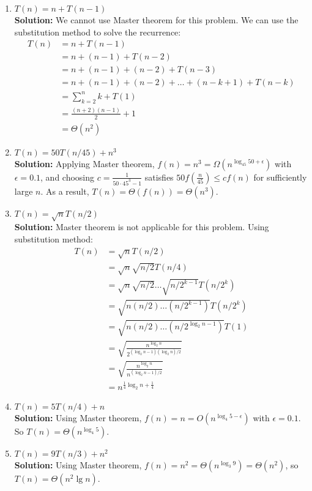 \documentclass[letterpaper, 11pt]{article}
\begin{document}
\begin{enumerate}
\item $T(n) = n+T(n-1)$\\
\textbf{Solution:} We cannot use Master theorem for this problem. We can use the substitution method to solve the recurrence:\\
\begin{align}
    T(n) &= n+T(n-1) \\
    &=n+(n-1)+T(n-2) \\
    &=n+(n-1)+(n-2)+T(n-3) \\
    &=n+(n-1)+(n-2)+\dots+(n-k+1)+T(n-k)\\
    &=\sum_{k=2}^{n}{k}+T(1)\\
    &=\frac{(n+2)(n-1)}{2}+1 \\
    &=\Theta(n^2)
\end{align}

\item $T(n) = 50T(n/45) + n^3$\\
\textbf{Solution:} Applying Master theorem, $f(n)=n^3=\Omega(n^{\log_{45}{50}+\epsilon})$ with $\epsilon=0.1$, and choosing $c=\frac{1}{50\cdot45^3-1}$ satisfies $50f(\frac{n}{45}) \le cf(n)$ for sufficiently large $n$. As a result, $T(n)=\Theta(f(n))=\Theta(n^3)$.

\item $T(n) = \sqrt{n}T(n/2)$\\
\textbf{Solution:} Master theorem is not applicable for this problem. Using substitution method:\\
\begin{align}
    T(n) &= \sqrt{n}T(n/2)\\
         &= \sqrt{n}\sqrt{n/2}T(n/4)\\
         &= \sqrt{n}\sqrt{n/2}\dots\sqrt{n/2^{k-1}}T(n/2^k)\\
         &= \sqrt{n(n/2)\dots(n/2^{k-1})}T(n/2^k)\\
         &= \sqrt{n(n/2)\dots(n/2^{\log_{2}{n}-1})}T(1)\\
         &= \sqrt{\frac{n^{\log_{2}{n}}}{2^{(\log_{2}{n}-1)(\log_{2}{n})/2}}}\\
         &= \sqrt{\frac{n^{\log_{2}{n}}}{n^{(\log_{2}{n}-1)/2}}}\\
         &= n^{\frac{1}{4}\log_{2}{n}+\frac{1}{4}}
\end{align}
\item $T(n) = 5T(n/4) + n$\\
\textbf{Solution:} Using Master theorem, $f(n)=n=O(n^{\log_{4}{5}-\epsilon})$ with $\epsilon=0.1$. So $T(n)=\Theta(n^{\log_{4}{5}})$.

\item $T(n) = 9T(n/3) + n^2$\\
\textbf{Solution:} Using Master theorem, $f(n)=n^2=\Theta(n^{\log_{3}{9}})=\Theta(n^2)$, so $T(n)=\Theta(n^2\lg{n})$.

\end{enumerate}
\end{document}
